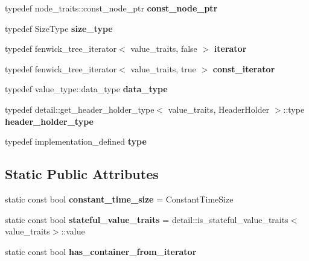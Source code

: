 \begin{DoxyCompactItemize}
typedef node\+\_\+traits\+::const\+\_\+node\+\_\+ptr {\bfseries const\+\_\+node\+\_\+ptr}
\item 
\mbox{\label{classboost_1_1intrusive_1_1fenwick__tree__impl_abf24adccfa8e65e8a382d4e25f906381}} 
typedef Size\+Type {\bfseries size\+\_\+type}
\item 
\mbox{\label{classboost_1_1intrusive_1_1fenwick__tree__impl_a6293502e34de9b16ae198ec557c82132}} 
typedef fenwick\+\_\+tree\+\_\+iterator$<$ value\+\_\+traits, false $>$ {\bfseries iterator}
\item 
\mbox{\label{classboost_1_1intrusive_1_1fenwick__tree__impl_a54559dc10b4a93114b1048ad9e41b5f1}} 
typedef fenwick\+\_\+tree\+\_\+iterator$<$ value\+\_\+traits, true $>$ {\bfseries const\+\_\+iterator}
\item 
\mbox{\label{classboost_1_1intrusive_1_1fenwick__tree__impl_acc226a36fd0f4814574917193e0c59ef}} 
typedef value\+\_\+type\+::data\+\_\+type {\bfseries data\+\_\+type}
\item 
\mbox{\label{classboost_1_1intrusive_1_1fenwick__tree__impl_ae20783e43141c54fd66b9b0c582ed94a}} 
typedef detail\+::get\+\_\+header\+\_\+holder\+\_\+type$<$ value\+\_\+traits, Header\+Holder $>$\+::type {\bfseries header\+\_\+holder\+\_\+type}
\item 
\mbox{\label{classboost_1_1intrusive_1_1fenwick__tree__impl_ad64ef3981e447fd80b987c085bca507f}} 
typedef implementation\+\_\+defined {\bfseries type}
\end{DoxyCompactItemize}
\subsection*{Static Public Attributes}
\begin{DoxyCompactItemize}
\item 
\mbox{\label{classboost_1_1intrusive_1_1fenwick__tree__impl_a271d33ddb2e4b9e70f400e7dc763efe4}} 
static const bool {\bfseries constant\+\_\+time\+\_\+size} = Constant\+Time\+Size
\item 
\mbox{\label{classboost_1_1intrusive_1_1fenwick__tree__impl_aa276108f012d96711ffa4ad519975757}} 
static const bool {\bfseries stateful\+\_\+value\+\_\+traits} = detail\+::is\+\_\+stateful\+\_\+value\+\_\+traits$<$value\+\_\+traits$>$\+::value
\item 
static const bool {\bfseries has\+\_\+container\+\_\+from\+\_\+iterator}
\end{DoxyCompactItemize}


